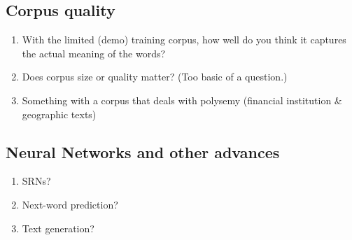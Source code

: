\subsection{Corpus quality}

\begin{enumerate}
\item With the limited (demo) training corpus, how well do you think it captures the actual meaning of the words?
\item Does corpus size or quality matter? (Too basic of a question.)
\item Something with a corpus that deals with polysemy (financial institution \& geographic texts)
\end{enumerate}

\subsection{Neural Networks and other advances}

\begin{enumerate}
\item SRNs?
\item Next-word prediction?
\item Text generation?
\end{enumerate}
